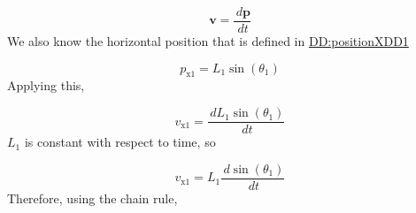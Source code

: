 \documentclass[12pt]{article}
\begin{document}
\begin{displaymath}
\symbf{v}=\frac{\,d\symbf{p}}{\,dt}
\end{displaymath}
We also know the horizontal position that is defined in \hyperref[DD:positionXDD1]{DD:positionXDD1}

\begin{displaymath}
{p_{\text{x}1}}={L_{1}} \sin\left({θ_{1}}\right)
\end{displaymath}
Applying this,

\begin{displaymath}
{v_{\text{x}1}}=\frac{\,d{L_{1}} \sin\left({θ_{1}}\right)}{\,dt}
\end{displaymath}
${L_{1}}$ is constant with respect to time, so

\begin{displaymath}
{v_{\text{x}1}}={L_{1}} \frac{\,d\sin\left({θ_{1}}\right)}{\,dt}
\end{displaymath}
Therefore, using the chain rule,
\end{document}

